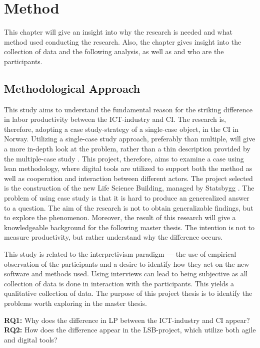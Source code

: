 
\chapter{Method}
This chapter will give an insight into why the research is needed and what method used conducting the research. Also, the chapter gives insight into the collection of data and the following analysis, as well as and who are the participants.

\section{Methodological Approach} \label{sec:purpose}
This study aims to understand the fundamental reason for the striking difference in labor productivity between the ICT-industry and CI. The research is, therefore, adopting a case study-strategy of a single-case object, in the CI in Norway. Utilizing a single-case study approach, preferably than multiple, will give a more in-depth look at the problem, rather than a thin description provided by the multiple-case study \cite{yin1993case}. This project, therefore, aims to examine a case using lean methodology, where digital tools are utilized to support both the method as well as cooperation and interaction between different actors. The project selected is the construction of the new Life Science Building, managed by Statsbygg \cite{statsbygg2019uio}. The problem of using case study is that it is hard to produce an generealized answer to a question. The aim of the research is not to obtain generalizable findings, but to explore the phenomenon. Moreover, the result of this research will give a knowledgeable background for the following master thesis. The intention is not to measure productivity, but rather understand why the difference occurs.

This study is related to the interpretivism paradigm — the use of empirical observation of the participants and a desire to identify how they act on the new software and methods used. Using interviews can lead to being subjective as all collection of data is done in interaction with the participants. This yields a qualitative collection of data. The purpose of this project thesis is to identify the problems worth exploring in the master thesis.

{\noindent \bf RQ1:} Why does the difference in LP between the ICT-industry and CI appear? \\
{\bf RQ2:} How does the difference appear in the LSB-project, which utilize both agile and digital tools?

